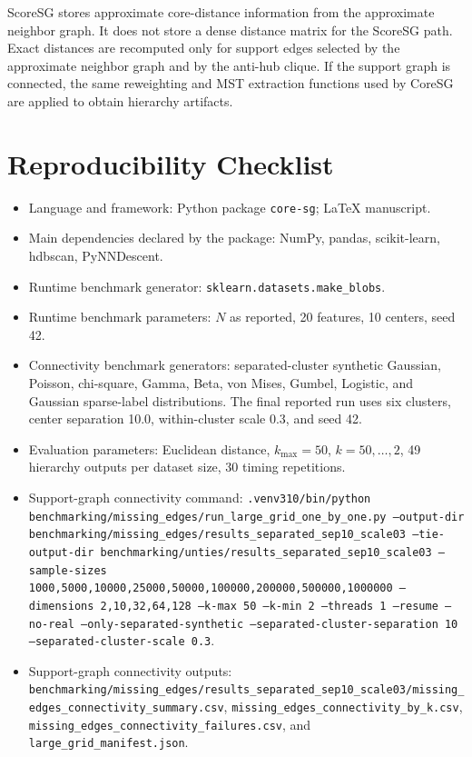 \documentclass[11pt]{article}
\begin{document}
ScoreSG stores approximate core-distance information from the approximate neighbor graph. It does not store a dense distance matrix for the ScoreSG path. Exact distances are recomputed only for support edges selected by the approximate neighbor graph and by the anti-hub clique. If the support graph is connected, the same reweighting and MST extraction functions used by CoreSG are applied to obtain hierarchy artifacts.

\section{Reproducibility Checklist}

\begin{itemize}[leftmargin=*]
  \item Language and framework: Python package \texttt{core-sg}; LaTeX manuscript.
  \item Main dependencies declared by the package: NumPy, pandas, scikit-learn, hdbscan, PyNNDescent.
  \item Runtime benchmark generator: \texttt{sklearn.datasets.make\_blobs}.
  \item Runtime benchmark parameters: \(N\) as reported, 20 features, 10 centers, seed 42.
  \item Connectivity benchmark generators: separated-cluster synthetic Gaussian, Poisson, chi-square, Gamma, Beta, von Mises, Gumbel, Logistic, and Gaussian sparse-label distributions. The final reported run uses six clusters, center separation 10.0, within-cluster scale 0.3, and seed 42.
  \item Evaluation parameters: Euclidean distance, \(k_{\max}=50\), \(k=50,\ldots,2\), 49 hierarchy outputs per dataset size, 30 timing repetitions.
  \item Support-graph connectivity command: \texttt{.venv310/bin/python benchmarking/missing\_edges/run\_large\_grid\_one\_by\_one.py --output-dir benchmarking/missing\_edges/results\_separated\_sep10\_scale03 --tie-output-dir benchmarking/unties/results\_separated\_sep10\_scale03 --sample-sizes 1000,5000,10000,25000,50000,100000,200000,500000,1000000 --dimensions 2,10,32,64,128 --k-max 50 --k-min 2 --threads 1 --resume --no-real --only-separated-synthetic --separated-cluster-separation 10 --separated-cluster-scale 0.3}.
  \item Support-graph connectivity outputs: \texttt{benchmarking/missing\_edges/results\_separated\_sep10\_scale03/missing\_edges\_connectivity\_summary.csv}, \texttt{missing\_edges\_connectivity\_by\_k.csv}, \texttt{missing\_edges\_connectivity\_failures.csv}, and \texttt{large\_grid\_manifest.json}.

\end{itemize}
\end{document}
